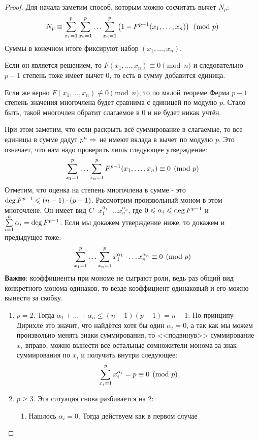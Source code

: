 \begin{proof}
	Для начала заметим способ, которым можно сосчитать вычет $N_p$:
	\[
		N_p \equiv \sum\limits_{x_1 = 1}^p \sum\limits_{x_2 = 1}^p \ldots \sum\limits_{x_n = 1}^p \left(1 - F^{p - 1}(x_1, \ldots, x_n)\right) \pmod p
	\]
	Суммы в конечном итоге фиксируют набор $(x_1, \ldots, x_n)$.
	
	Если он является решением, то $F(x_1, \ldots, x_n) \equiv 0 \pmod n$ и следовательно $p - 1$ степень тоже имеет вычет 0, то есть в сумму добавится единица.
	
	Если же верно $F(x_1, \ldots, x_n) \not\equiv 0 \pmod n$, то по малой теореме Ферма $p - 1$ степень значения многочлена будет сравнима с единицей по модулю $p$. Стало быть, такой многочлен обратит слагаемое в 0 и не будет никак учтён.
	
	При этом заметим, что если раскрыть всё суммирование в слагаемые, то все единицы в сумме дадут $p^n \Rightarrow$ не имеют вклада в вычет по модулю $p$. Это означает, что нам надо проверить лишь следующее утверждение:
	\[
		\sum\limits_{x_1 = 1}^p \ldots \sum\limits_{x_n = 1}^p F^{p - 1}(x_1, \ldots, x_n) \equiv 0 \pmod p
	\]
	Отметим, что оценка на степень многочлена в сумме - это $\operatorname{deg} F^{p - 1} \leqslant (n - 1) \cdot (p - 1)$. Рассмотрим произвольный моном в этом многочлене. Он имеет вид $C \cdot x_1^{\alpha_1} \cdot \ldots x_n^{\alpha_n}$, где $0 \leqslant \alpha_i \leqslant \operatorname{deg} F^{p - 1}$ и $\sum\limits_{i = 1}^n \alpha_i = \operatorname{deg} F^{p - 1}$. Если мы докажем утверждение ниже, то докажем и предыдущее тоже:
	\[
		\sum\limits_{x_1 = 1}^p \ldots \sum\limits_{x_n = 1}^p x_1^{\alpha_1} \cdot \ldots x_n^{\alpha_n} \equiv 0 \pmod p
	\]
	\textbf{Важно}: коэффициенты при мономе не сыграют роли, ведь раз общий вид конкретного монома одинаков, то везде коэффициент одинаковый и его можно вынести за скобку.
	\begin{enumerate}
		\item $p = 2$. Тогда $\alpha_1 + \ldots + \alpha_n \le (n - 1)(p - 1) = n - 1$. По принципу Дирихле это значит, что найдётся хотя бы один $\alpha_i = 0$, а так как мы можем произвольно менять знаки суммирования, то <<подвинув>> суммирование $x_i$ вправо, можно вынести все остальные сомножители монома за знак суммирования по $x_i$ и получить внутри следующее:
		\[
			\sum\limits_{x_i = 1}^p x_i^{\alpha_i} = p \equiv 0 \pmod p
		\]
		
		\item $p \ge 3$. Эта ситуация снова разбивается на 2:
		\begin{enumerate}
			\item Нашлось $\alpha_i = 0$. Тогда действуем как в первом случае
			

\end{enumerate}
\end{enumerate}
\end{proof}
